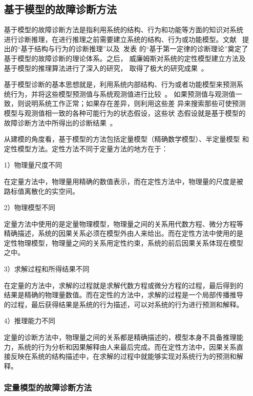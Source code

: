 \subsection{基于模型的故障诊断方法}

基于模型的故障诊断方法是指利用系统的结构、行为和功能等方面的知识对系统
进行诊断推理，在进行推理之前需要建立系统的结构、行为或功能模型。文献~
提出的“基于结构与行为的诊断推理”以及~发表
的“基于第一定律的诊断理论”奠定了基于模型的故障诊断的理论体系。之后，
威廉姆斯对系统的定性模型建立方法及基于模型的推理算法进行了深入的研究，
取得了极大的研究成果~\cite{hofbaur2004hybrid, hofbaur2002hybrid}。

基于模型诊断的基本思想就是，利用系统内部结构、行为或者功能模型来预测系
统行为，并将这些模型预测值与系统观测值进行比较~\cite{console1999model, davis1988model, mosterman1998comprehensive}。
如果预测值与观测值一致，则说明系统工作正常；如果存在差异，则利用这些差
异来搜索那些可使预测模型与观测值相一致的各种可能行为的状态假设，这些状
态假设就是基于模型的故障诊断方法中所得出的诊断结果~\cite{wotawa2000debugging, friedrich1999model}。

从建模的角度看，基于模型的方法包括定量模型（精确数学模型）、半定量模型
和定性模型方法。定性方法不同于定量方法的地方在于：

1）物理量尺度不同

在定量方法中，物理量用精确的数值表示，而在定性方法中，物理量的尺度是被
路标值离散化的实空间。

2）物理模型不同

定量方法中使用的是定量物理模型，物理量之间的关系用代数方程、微分方程等
精确描述，系统的因果关系必须在模型外由人来给出。而在定性方法中使用的是
定性物理模型，物理量之间的关系用定性约束，系统的前后因果关系体现在模型
之中。

3）求解过程和所得结果不同

在定量的方法中，求解的过程就是求解代数方程或微分方程的过程，最后得到的
结果是精确的物理量数值。而在定性的方法中，求解的过程是一个局部传播推导
的过程，最后获得结果是系统的行为描述，可以对系统的行为进行预测和解释。

4）推理能力不同

定量的诊断方法中，物理量之间的关系都是精确描述的，模型本身不具备推理能
力，系统的行为分析和因果解释由人来最后完成。而在定性方法中，因果关系直
接反映在系统的结构描述中，在求解的过程中就能够实现对系统行为的预测和解
释。

\subsubsection{定量模型的故障诊断方法}

